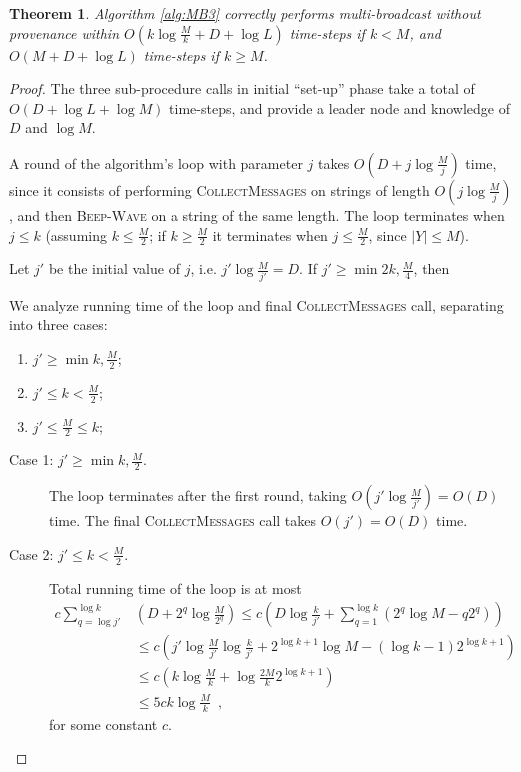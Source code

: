 \documentclass{article}
\newtheorem{theorem}{Theorem}
\newcommand{\cj}{\ensuremath{c}\xspace}
\begin{document}
\begin{theorem}
	\label{the:MB3}
	Algorithm \ref{alg:MB3} correctly performs multi-broadcast without provenance within $O(k \log \frac{M}{k} + D+\log L)$ time-steps if $k<M$, and $O(M + D+\log L)$ time-steps if $k \ge M$.
\end{theorem}
\begin{proof}
	The three sub-procedure calls in initial ``set-up'' phase take a total of $O(D + \log L + \log M)$ time-steps, and provide a leader node and knowledge of $D$ and $\log M$.
	
	A round of the algorithm's loop with parameter $j$ takes $O(D+j\log \frac {M}{j})$ time, since it consists of performing \textsc{CollectMessages} on strings of length $O(j\log \frac {M}{j})$, and then \textsc{Beep-Wave} on a string of the same length. The loop terminates when $j\leq k$ (assuming $k\leq \frac M2$; if $k\geq \frac M2$ it terminates when $j\leq \frac M2$, since $|Y|\leq M$). 
	
	Let $j'$ be the initial value of $j$, i.e. $j'\log \frac {M}{j'} = D$. If $j'\geq \min{2k,\frac M4}$, then 
	
	We analyze running time of the loop and final \textsc{CollectMessages} call, separating into three cases: 
	\begin{enumerate}[\bf (1) ]
		\item $j'\geq \min{k,\frac M2}$;
		\item $j'\leq k<\frac M2$;
		\item $j'\leq \frac M2\leq k$;
	\end{enumerate}
	
	\begin{description}
		\item[Case 1: $j'\geq \min{k,\frac M2}$.]
		
		The loop terminates after the first round, taking $O(j'\log \frac {M}{j'}) = O(D)$ time. The final \textsc{CollectMessages} call takes $O(j') = O(D)$ time.
		
		\item[Case 2: $j'\leq k<\frac M2$.]
		
		Total running time of the loop is at most
		\begin{align*}
		\cj\sum\limits_{q=\log j'}^{\log k}&\left(D+2^q\log \frac {M}{2^q}\right)
		\leq \cj(D\log\frac{k}{j'} +\sum\limits_{q=1}^{\log k}(2^q\log M-q2^q))\\
		&\leq \cj(j'\log \frac {M}{j'}\log\frac{k}{j'} + 2^{\log k + 1}\log M - (\log k -1) 2^{\log k + 1})\\
		&\leq \cj(k\log \frac {M}{k} + \log\frac{2M}{k}2^{\log k + 1})\\
		&\leq 5\cj k \log \frac Mk\enspace,
		\end{align*}
		for some constant $\cj$.
		

\end{description}
\end{proof}
\end{document}
